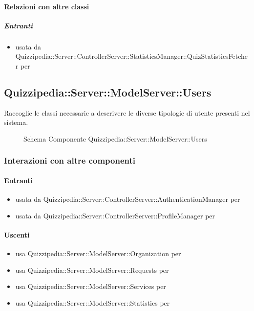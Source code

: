 \paragraph{Relazioni con altre classi}
\subparagraph{Entranti}
\begin{itemize}
\item usata da Quizzipedia::Server::ControllerServer::StatisticsManager::QuizStatisticsFetcher per 
\end{itemize}
\subsection{Quizzipedia::Server::ModelServer::Users}
Raccoglie le classi necessarie a descrivere le diverse tipologie di utente presenti nel sistema.
\begin{figure}[H]
\centering
\noindent{}
\caption[Schema Componente Quizzipedia::Server::ModelServer::Users]{Schema Componente Quizzipedia::Server::ModelServer::Users}
\end{figure}
\subsubsection{Interazioni con altre componenti}
\paragraph{Entranti}
\begin{itemize}
\item usata da Quizzipedia::Server::ControllerServer::AuthenticationManager per 
\item usata da Quizzipedia::Server::ControllerServer::ProfileManager per 
\end{itemize}
\paragraph{Uscenti}
\begin{itemize}
\item usa Quizzipedia::Server::ModelServer::Organization per 
\item usa Quizzipedia::Server::ModelServer::Requests per 
\item usa Quizzipedia::Server::ModelServer::Services per 
\item usa Quizzipedia::Server::ModelServer::Statistics per 
\end{itemize}
